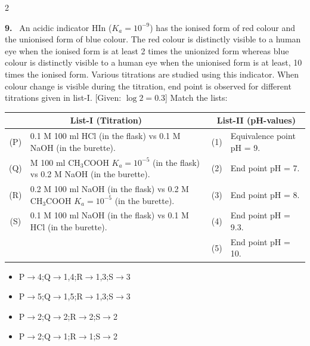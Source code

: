 \documentclass[10pt]{extarticle}
\newcommand{\qn}[1]{\par\smallskip\noindent\textbf{#1.}~}
\newenvironment{qoptions}{\begin{itemize}[leftmargin=1.8em,itemsep=1pt,topsep=2pt,label={}]}{\end{itemize}}
\newcommand{\opt}[2]{\item[(#1)] #2}
\begin{document}
\begin{multicols}{2}
\qn{9} An acidic indicator HIn ($K_a=10^{-9}$) has the ionised form of red colour and the unionised form of blue colour. The red colour is distinctly visible to a human eye when the ionised form is at least 2 times the unionized form whereas blue colour is distinctly visible to a human eye when the unionised form is at least, 10 times the ionised form. Various titrations are studied using this indicator. When colour change is visible during the titration, end point is observed for different titrations given in list-I. [Given: $\log2=0.3$]
Match the lists:
\begin{center}
\begin{tabular}{|c|p{3.8cm}|c|p{2.0cm}|}
\hline
\multicolumn{2}{|p{4.1cm}|}{\centering List-I (Titration)} & \multicolumn{2}{p{2.3cm}|}{\centering List-II (pH-values)} \\
\hline
(P) & 0.1 M 100 ml HCl (in the flask) vs 0.1 M NaOH (in the burette). & (1) & Equivalence point pH = 9. \\
\hline
(Q) & {\sloppy 0.2 M 100 ml CH$_3$COOH $K_a=10^{-5}$ (in the flask) vs 0.2 M NaOH (in the burette).\par} & (2) & End point pH = 7. \\
\hline
(R) & 0.2 M 100 ml NaOH (in the flask) vs 0.2 M CH$_3$COOH $K_a=10^{-5}$ (in the burette). & (3) & End point pH = 8. \\
\hline
(S) & 0.1 M 100 ml NaOH (in the flask) vs 0.1 M HCl (in the burette). & (4) & End point pH = 9.3. \\
\hline
 & & (5) & End point pH = 10. \\
\hline
\end{tabular}
\end{center}
\begin{qoptions}
\opt{A}{P$\to$4;Q$\to$1,4;R$\to$1,3;S$\to$3}
\opt{B}{P$\to$5;Q$\to$1,5;R$\to$1,3;S$\to$3}
\opt{C}{P$\to$2;Q$\to$2;R$\to$2;S$\to$2}
\opt{D}{P$\to$2;Q$\to$1;R$\to$1;S$\to$2}
\end{qoptions}


\end{multicols}
\end{document}
